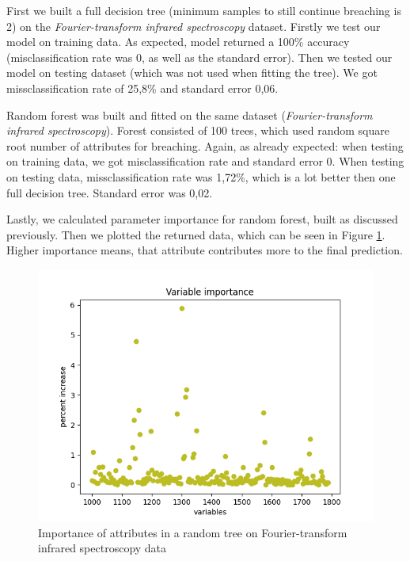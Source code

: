 \documentclass{article}
\begin{document}
First we built a full decision tree (minimum samples to still continue breaching is 2) on the \emph{Fourier-transform infrared spectroscopy} dataset. Firstly we test our model on training data. As expected, model returned a 100\% accuracy (misclassification rate was 0, as well as the standard error). Then we tested our model on testing dataset (which was not used when fitting the tree). We got missclassification rate of 25,8\% and standard error 0,06.

Random forest was built and fitted on the same dataset (\emph{Fourier-transform infrared spectroscopy}). Forest consisted of 100 trees, which used random square root number of attributes for breaching. Again, as already expected: when testing on training data, we got misclassification rate and standard error 0. When testing on testing data, missclassification rate was 1,72\%, which is a lot better then one full decision tree. Standard error was 0,02.

Lastly, we calculated parameter importance for random forest, built as discussed previously. Then we plotted the returned data, which can be seen in Figure \ref{fig:example}. Higher importance means, that attribute contributes more to the final prediction.

\begin{figure}[ht]
  \centering
  \includegraphics[width=1\textwidth]{importance.png}
  \caption{Importance of attributes in a random tree on Fourier-transform infrared spectroscopy data}
  \label{fig:example}
\end{figure}


\printbibliography
\end{document}
